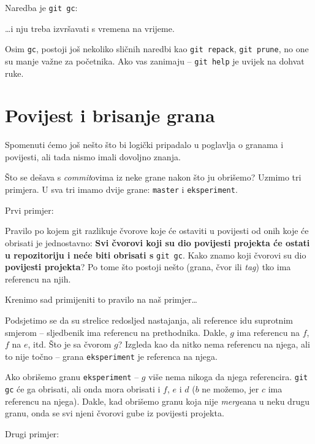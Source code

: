 Naredba je \verb+git gc+:



\dots{}i nju treba izvršavati s vremena na vrijeme.

Osim \verb+gc+, postoji još nekoliko sličnih naredbi kao \verb+git repack+, \verb+git prune+, no one su manje važne za početnika.
Ako vas zanimaju -- \verb+git help+ je uvijek na dohvat ruke.

\section*{Povijest i brisanje grana}

Spomenuti ćemo još nešto što bi logički pripadalo u poglavlja o granama i povijesti, ali tada nismo imali dovoljno znanja.

Što se dešava s \emph{commit}ovima iz neke grane nakon što ju obrišemo?
Uzmimo tri primjera.
U sva tri imamo dvije grane: \verb+master+ i \verb+eksperiment+.

Prvi primjer:



Pravilo po kojem git razlikuje čvorove koje će ostaviti u povijesti od onih koje će obrisati je jednostavno:
\textbf{Svi čvorovi koji su dio povijesti projekta će ostati u repozitoriju i neće biti obrisati s} \verb+git gc+.
Kako znamo koji čvorovi su dio \textbf{povijesti projekta}?
Po tome što postoji nešto (grana, čvor ili \emph{tag}) tko ima referencu na njih.

Krenimo sad primijeniti to pravilo na naš primjer\dots

Podsjetimo se da su strelice redosljed nastajanja, ali reference idu suprotnim smjerom -- sljedbenik ima referencu na prethodnika.
Dakle, $g$ ima referencu na $f$, $f$ na $e$, itd.
Što je sa čvorom $g$? 
Izgleda kao da nitko nema referencu na njega, ali to nije točno -- grana \verb+eksperiment+ je referenca na njega.

Ako obrišemo granu \verb+eksperiment+ -- $g$ više nema nikoga da njega referencira.
\verb+git gc+ će ga obrisati, ali onda mora obrisati i $f$, $e$ i $d$ ($b$ ne možemo, jer $c$ ima referencu na njega).
Dakle, kad obrišemo granu koja nije \emph{merge}ana u neku drugu granu, onda se svi njeni čvorovi gube iz povijesti projekta.

Drugi primjer:



